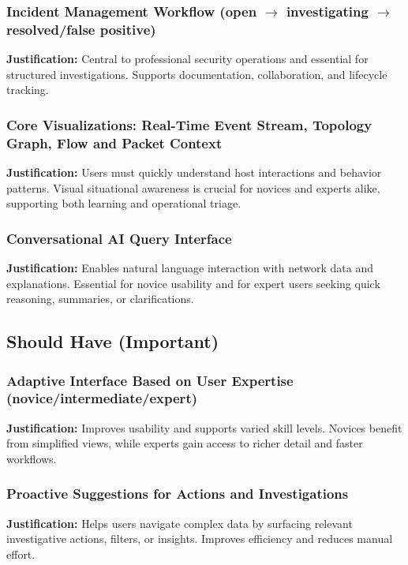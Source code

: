 \documentclass[
    11pt, 
    a4paper, 
    parskip=half, 
    headsepline,       %
    DIV=12             %
]{scrartcl}
\begin{document}
\subsubsection*{Incident Management Workflow (open $\rightarrow$ investigating $\rightarrow$ resolved/false positive)}
\noindent\textbf{Justification:}
Central to professional security operations and essential for structured investigations. Supports documentation, collaboration, and lifecycle tracking.

\subsubsection*{Core Visualizations: Real-Time Event Stream, Topology Graph, Flow and Packet Context}
\noindent\textbf{Justification:}
Users must quickly understand host interactions and behavior patterns. Visual situational awareness is crucial for novices and experts alike, supporting both learning and operational triage.

\subsubsection*{Conversational AI Query Interface}
\noindent\textbf{Justification:}
Enables natural language interaction with network data and explanations. Essential for novice usability and for expert users seeking quick reasoning, summaries, or clarifications.

\subsection{Should Have (Important)}

\subsubsection*{Adaptive Interface Based on User Expertise (novice/intermediate/expert)}
\noindent\textbf{Justification:}
Improves usability and supports varied skill levels. Novices benefit from simplified views, while experts gain access to richer detail and faster workflows.

\subsubsection*{Proactive Suggestions for Actions and Investigations}
\noindent\textbf{Justification:}
Helps users navigate complex data by surfacing relevant investigative actions, filters, or insights. Improves efficiency and reduces manual effort.
\end{document}
